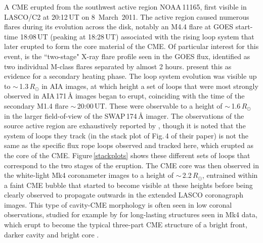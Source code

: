 \documentclass[namedreferences]{solarphysics}
\begin{document}
\begin{article}
A CME erupted from the southwest active region NOAA\,11165, first visible in LASCO/C2 at 20:12\,UT on 8~March~2011. The active region caused numerous flares during its evolution across the disk, notably an M4.4 flare at GOES start-time 18:08\,UT (peaking at 18:28\,UT) associated with the rising loop system that later erupted to form the core material of the CME. Of particular interest for this event, is the ``two-stage" X-ray flare profile seen in the GOES flux, identified as two individual M-class flares separated by almost 2 hours.  present this as evidence for a secondary heating phase. The loop system evolution was visible up to $\sim$\,1.3\,$R_{\odot}$ in AIA images, at which height a set of loops that were most strongly observed in AIA\,171\,{\AA} images began to erupt, coinciding with the time of the secondary M1.4 flare $\sim$\,20:00\,UT. These were observable to a height of $\sim$\,1.6\,$R_{\odot}$ in the larger field-of-view of the SWAP\,174\,{\AA} imager. The observations of the source active region are exhaustively reported by , though it is noted that the system of loops they track (in the stack plot of Fig.\,4 of their paper) is not the same as the specific flux rope loops observed and tracked here, which erupted as the core of the CME. Figure\,\ref{stackplots} shows these different sets of loops that correspond to the two stages of the eruption. The CME core was then observed in the white-light Mk4 coronameter images to a height of $\sim$\,2.2\,$R_{\odot}$, entrained within a faint CME bubble that started to become visible at these heights before being clearly observed to propagate outwards in the extended LASCO coronagraph images. This type of cavity-CME morphology is often seen in low coronal observations, studied for example by  for long-lasting structures seen in Mk4 data, which erupt to become the typical three-part CME structure of a bright front, darker cavity and bright core \cite{1986JGR....9110951I}.  %


\end{article}
\end{document}
